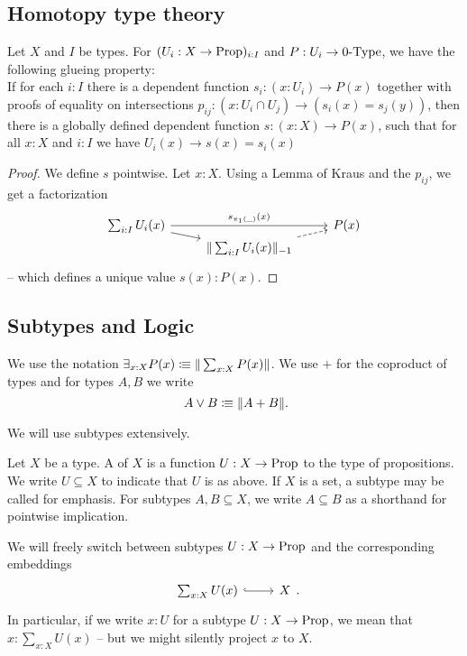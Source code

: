 \subsection{Homotopy type theory}

\begin{lemma}%
  \label{kraus-glueing}
  Let $X$ and $I$ be types.
  For $(U_i:X \to \mathrm{Prop})_{i:I}$ and $P:U_i\to 0\mbox{-}\mathrm{Type}$, we have the following glueing property: \\
  If for each $i:I$ there is a dependent function $s_i:(x:U_i)\to P(x)$ together with
  proofs of equality on intersections $p_{ij}:(x:U_i\cap U_j)\to (s_i(x)=s_j(y))$,
  then there is a globally defined dependent function $s:(x:X) \to P(x)$,
  such that for all $x:X$ and $i:I$ we have $U_i(x) \to s(x)=s_i(x)$
\end{lemma}

\begin{proof}
  We define $s$ pointwise.
  Let $x:X$.
  Using a Lemma of Kraus and the $p_{ij}$, we get a factorization
  \[ \begin{tikzcd}[row sep=0mm]
    \sum_{i:I} U_i(x) \ar[rr, "s_{\pi_1(\_)}(x)"]\ar[rd] & & P(x) \\
    & \|\sum_{i:I} U_i(x)\|_{-1}\ar[ru,dashed] &
  \end{tikzcd} \]
-- which defines a unique value $s(x):P(x)$.
\end{proof}

\subsection{Subtypes and Logic}

We use the notation $\exists_{x:X}P(x)\vcentcolon\mspace{-1.2mu}\equiv \|\sum_{x:X}P(x)\|$.
We use $+$ for the coproduct of types and for types $A,B$ we write
\[ A\vee B\colonequiv \| A+B \|\rlap{.}\]

We will use subtypes extensively.

\begin{definition}
  \index{$\subseteq$}
  Let $X$ be a type.
  A  of $X$ is a function $U:X\to\mathrm{Prop}$ to the type of propositions.
  We write $U\subseteq X$ to indicate that $U$ is as above.
  If $X$ is a set, a subtype may be called  for emphasis.
  For subtypes $A,B\subseteq X$, we write $A\subseteq B$ as a shorthand for pointwise implication.
\end{definition}

We will freely switch between subtypes $U:X\to\mathrm{Prop}$ and the corresponding embeddings
\[
  \begin{tikzcd}
    \sum_{x:X}U(x) \ar[r,hook] & X
  \end{tikzcd}
  \rlap{.}
\]
In particular, if we write $x:U$ for a subtype $U:X\to\mathrm{Prop}$, we mean that $x:\sum_{x:X}U(x)$ -- but we might silently project $x$ to $X$.

